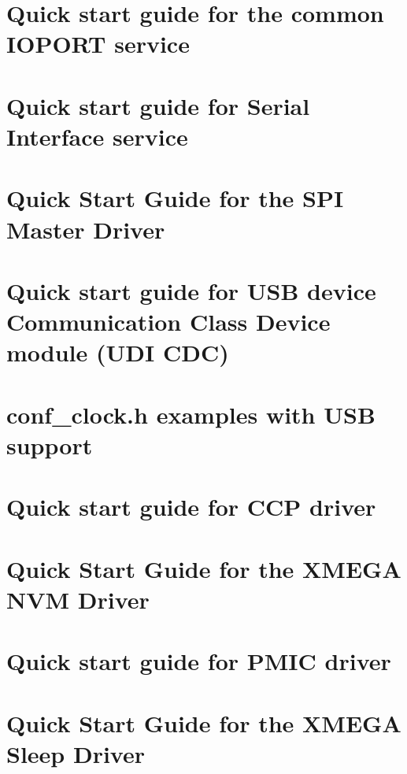 \documentclass{book}
\begin{document}
\chapter{Quick start guide for the common I\-O\-P\-O\-R\-T service}
\label{ioport_quickstart}
\hypertarget{ioport_quickstart}{}

\chapter{Quick start guide for Serial Interface service}
\label{serial_quickstart}
\hypertarget{serial_quickstart}{}

\chapter{Quick Start Guide for the S\-P\-I Master Driver}
\label{common_spi_master_quickstart}
\hypertarget{common_spi_master_quickstart}{}

\chapter{Quick start guide for U\-S\-B device Communication Class Device module (U\-D\-I C\-D\-C)}
\label{udi_cdc_quickstart}
\hypertarget{udi_cdc_quickstart}{}

\chapter{conf\-\_\-clock.\-h examples with U\-S\-B support}
\label{udc_conf_clock}
\hypertarget{udc_conf_clock}{}

\chapter{Quick start guide for C\-C\-P driver}
\label{xmega_ccp_quickstart}
\hypertarget{xmega_ccp_quickstart}{}

\chapter{Quick Start Guide for the X\-M\-E\-G\-A N\-V\-M Driver}
\label{xmega_nvm_quickstart}
\hypertarget{xmega_nvm_quickstart}{}

\chapter{Quick start guide for P\-M\-I\-C driver}
\label{xmega_pmic_quickstart}
\hypertarget{xmega_pmic_quickstart}{}

\chapter{Quick Start Guide for the X\-M\-E\-G\-A Sleep Driver}
\label{xmega_sleep_quickstart}
\hypertarget{xmega_sleep_quickstart}{}

\end{document}
